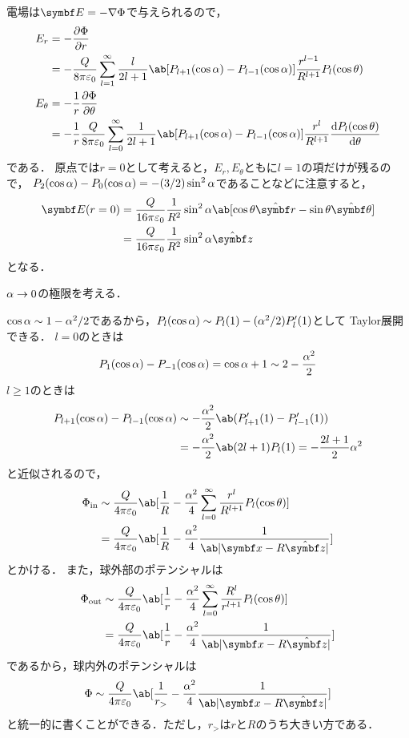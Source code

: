 電場は$\bs{E} = -\gr \Phi$で与えられるので，
\begin{align}%
  E_r &= -\diffp{\Phi}{r} \notag\\
  &= -\frac{Q}{8\pi \eps_0}\sum_{l=1}^\infty
  \frac{l}{2l+1}\ab[P_{l+1}(\cos\alpha) - P_{l-1}(\cos\alpha)] 
  \frac{r^{l-1}}{R^{l+1}} P_l(\cos\theta)\\
  E_\theta &= -\frac{1}{r}\diffp{\Phi}{\theta} \notag\\
  &= -\frac{1}{r}\frac{Q}{8\pi\eps_0} 
  \sum_{l=0}^\infty \frac{1}{2l+1} \ab[P_{l+1}(\cos\alpha) - P_{l-1}(\cos\alpha)]\frac{r^l}{R^{l+1}} \diff{P_l(\cos\theta)}{\theta}
\end{align}%
である．
原点では$r = 0$として考えると，$E_r, E_\theta$ともに$l=1$の項だけが残るので，
$P_2(\cos\alpha) - P_0(\cos\alpha) = -(3/2)\sin^2\alpha$であることなどに注意すると，
\begin{align}%
  \bs{E}(r=0) &= \frac{Q}{16\pi\eps_0}\frac{1}{R^2}\sin^2\alpha \ab[\cos\theta \hat{\bs{r}} - \sin\theta \hat{\bs{\theta}}] \notag\\
  &= \frac{Q}{16\pi \eps_0} \frac{1}{R^2}\sin^2\al \hat{\bs{z}}
\end{align}%
となる．

$\alpha \to 0$の極限を考える．

$\cos\alpha \sim 1 - \alpha^2 / 2$であるから，$P_l(\cos\alpha) \sim P_l(1) - (\alpha^2/2)P_l'(1)$として
Taylor展開できる．
$l = 0$のときは
\begin{gather}%
  P_1(\cos\al) - P_{-1}(\cos\al) = \cos\al + 1 \sim 2 - \frac{\al^2}{2}
\end{gather}%
$l \geq 1$のときは
\begin{align}%
  P_{l+1}(\cos\al) - P_{l-1}(\cos\al) 
  &\sim -\frac{\al^2}{2}\ab(P_{l+1}'(1) - P_{l-1}'(1))\notag\\
  &= -\frac{\al^2}{2}\ab(2l+1) P_l(1) = -\frac{2l+1}{2}\al^2
\end{align}%
と近似されるので，
\begin{align}%
  \Phi_{\text{in}} &\sim 
  \frac{Q}{4\pi \eps_0} \ab[\frac{1}{R} 
  - \frac{\al^2}{4}\sum_{l=0}^\infty \frac{r^l}{R^{l+1}}P_l(\cos\theta)]\notag\\
  &= \frac{Q}{4\pi\eps_0}\ab[
    \frac{1}{R} - \frac{\al^2}{4} \frac{1}{\ab|\bs{x} - R\hat{\bs{z}}|}
  ]
\end{align}%
とかける．
また，球外部のポテンシャルは
\begin{align}%
  \Phi_{\text{out}} &\sim \frac{Q}{4\pi\eps_0}\ab[
    \frac{1}{r} - \frac{\al^2}{4} \sum_{l=0}^\infty \frac{R^l}{r^{l+1}}P_l(\cos\theta)
  ]\notag\\
  &= \frac{Q}{4\pi\eps_0} \ab[
    \frac{1}{r} - \frac{\al^2}{4} \frac{1}{\ab|\bs{x} - R\hat{\bs{z}}|}
  ]
\end{align}%
であるから，球内外のポテンシャルは
\begin{gather}%
  \Phi \sim \frac{Q}{4\pi\eps_0} \ab[\frac{1}{r_>} - \frac{\al^2}{4}\frac{1}{\ab|\bs{x} - R \hat{\bs{z}}|}]
\end{gather}%
と統一的に書くことができる．ただし，$r_>$は$r$と$R$のうち大きい方である．

